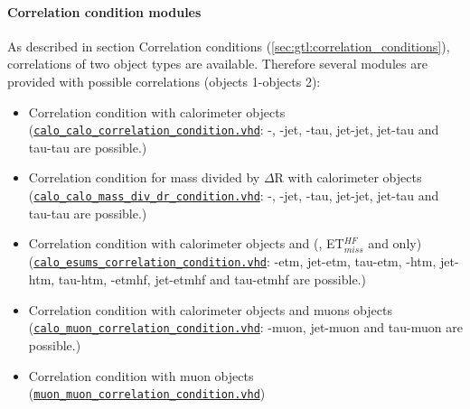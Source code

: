 \paragraph{Correlation condition modules}
\label{sec:gtl:correlation_condition_modules}

As described in section Correlation conditions (\ref{sec:gtl:correlation_conditions}), correlations of two object types are available. Therefore several modules are provided with possible correlations (objects 1-objects 2):
\begin{itemize}
\item Correlation condition with calorimeter objects\\
(\href{https://github.com/cms-l1-globaltrigger/mp7_ugt_legacy/tree/master/firmware/hdl/gt_mp7_core/gtl_fdl_wrapper/gtl/calo_calo_correlation_condition.vhd}{\texttt{calo\_calo\_correlation\_condition.vhd}}: \egamma-\egamma, \egamma-jet, \egamma-tau, jet-jet, jet-tau and tau-tau are possible.)
\item Correlation condition for mass divided by $\Delta$R with calorimeter objects\\
(\href{https://github.com/cms-l1-globaltrigger/mp7_ugt_legacy/tree/master/firmware/hdl/gt_mp7_core/gtl_fdl_wrapper/gtl/calo_calo_mass_div_dr_condition.vhd}{\texttt{calo\_calo\_mass\_div\_dr\_condition.vhd}}: \egamma-\egamma, \egamma-jet, \egamma-tau, jet-jet, jet-tau and tau-tau are possible.)
\item Correlation condition with calorimeter objects and \esums (\etm, ET$_{miss}^{HF}$ and \htm only)\\
(\href{https://github.com/cms-l1-globaltrigger/mp7_ugt_legacy/tree/master/firmware/hdl/gt_mp7_core/gtl_fdl_wrapper/gtl/calo_esums_correlation_condition.vhd}{\texttt{calo\_esums\_correlation\_condition.vhd}}: \egamma-etm, jet-etm, tau-etm, \egamma-htm, jet-htm, tau-htm, \egamma-etmhf, jet-etmhf and tau-etmhf are possible.)
\item Correlation condition with calorimeter objects and muons objects\\
(\href{https://github.com/cms-l1-globaltrigger/mp7_ugt_legacy/tree/master/firmware/hdl/gt_mp7_core/gtl_fdl_wrapper/gtl/calo_muon_correlation_condition.vhd}{\texttt{calo\_muon\_correlation\_condition.vhd}}: \egamma-muon, jet-muon and tau-muon are possible.)
\item Correlation condition with muon objects\\
(\href{https://github.com/cms-l1-globaltrigger/mp7_ugt_legacy/tree/master/firmware/hdl/gt_mp7_core/gtl_fdl_wrapper/gtl/muon_muon_correlation_condition.vhd}{\texttt{muon\_muon\_correlation\_condition.vhd}})

\end{itemize}
